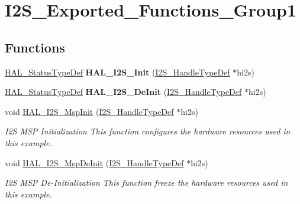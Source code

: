 \hypertarget{group___i2_s___exported___functions___group1}{}\section{I2\+S\+\_\+\+Exported\+\_\+\+Functions\+\_\+\+Group1}
\label{group___i2_s___exported___functions___group1}
\subsection*{Functions}
\begin{DoxyCompactItemize}
\item 
\mbox{\label{group___i2_s___exported___functions___group1_ga605f23b9dc1f0979f4b59702fb8d058d}} 
\hyperlink{stm32f4xx__hal__def_8h_a63c0679d1cb8b8c684fbb0632743478f}{H\+A\+L\+\_\+\+Status\+Type\+Def} {\bfseries H\+A\+L\+\_\+\+I2\+S\+\_\+\+Init} (\hyperlink{group___i2_s___exported___types_ga859f888192a094b456619601937580f5}{I2\+S\+\_\+\+Handle\+Type\+Def} $\ast$hi2s)
\item 
\mbox{\label{group___i2_s___exported___functions___group1_ga9119fe0f644a9f011415afaf8661232a}} 
\hyperlink{stm32f4xx__hal__def_8h_a63c0679d1cb8b8c684fbb0632743478f}{H\+A\+L\+\_\+\+Status\+Type\+Def} {\bfseries H\+A\+L\+\_\+\+I2\+S\+\_\+\+De\+Init} (\hyperlink{group___i2_s___exported___types_ga859f888192a094b456619601937580f5}{I2\+S\+\_\+\+Handle\+Type\+Def} $\ast$hi2s)
\item 
void \hyperlink{group___i2_s___exported___functions___group1_ga5033142a7bf0de4513782bbee1823a97}{H\+A\+L\+\_\+\+I2\+S\+\_\+\+Msp\+Init} (\hyperlink{group___i2_s___exported___types_ga859f888192a094b456619601937580f5}{I2\+S\+\_\+\+Handle\+Type\+Def} $\ast$hi2s)
\begin{DoxyCompactList}\small\item\em I2S M\+SP Initialization This function configures the hardware resources used in this example. \end{DoxyCompactList}\item 
void \hyperlink{group___i2_s___exported___functions___group1_ga7ef92677a8ff770f754d4dfc2aceb39b}{H\+A\+L\+\_\+\+I2\+S\+\_\+\+Msp\+De\+Init} (\hyperlink{group___i2_s___exported___types_ga859f888192a094b456619601937580f5}{I2\+S\+\_\+\+Handle\+Type\+Def} $\ast$hi2s)
\begin{DoxyCompactList}\small\item\em I2S M\+SP De-\/\+Initialization This function freeze the hardware resources used in this example. \end{DoxyCompactList}\end{DoxyCompactItemize}


